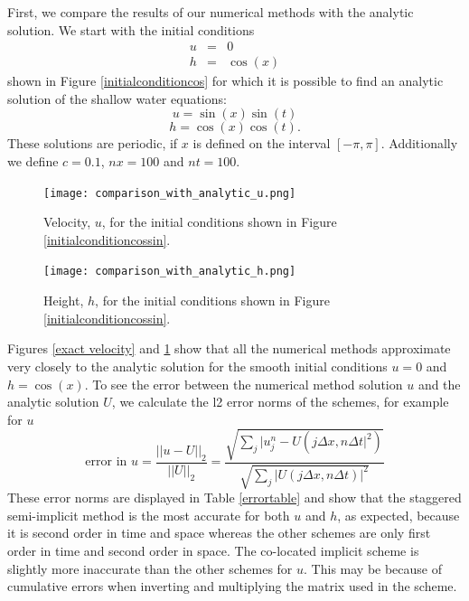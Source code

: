 \documentclass[a4paper, 10.5pt, notitlepage]{article}
\begin{document}
First, we compare the results of our numerical methods with the analytic solution. We start with the initial conditions 
\begin{eqnarray}
u  & =  & 0 \\
h & = &  \cos(x)
\end{eqnarray}
shown in Figure \ref{initialconditioncos} for which it is possible to find an analytic solution of the shallow water equations:
\begin{equation}\label{uanalytic}
u = \sin(x)\sin(t)
\end{equation}
\begin{equation}\label{hanalytic}
h = \cos(x)\cos(t).
\end{equation}
These solutions are periodic, if $x$ is defined on the interval $[-\pi, \pi]$. Additionally we define  $c = 0.1$, $nx = 100$ and $nt = 100$.


\renewcommand\theContinuedFloat{\alph{ContinuedFloat}}
\begin{figure} [H]
	\begin{minipage}{.5\textwidth}
		\ContinuedFloat*
		\captionsetup{width=0.9\textwidth}
		\captionsetup{justification=centering}
		\texttt{[image: comparison\_with\_analytic\_u.png]}
		\caption{\label{exact velocity} Velocity, $u$, for the initial conditions shown in Figure \ref{initialconditioncossin}. } 
	\end{minipage}
	\begin{minipage}{.5\textwidth}
		\ContinuedFloat
		\captionsetup{width=0.9\textwidth}
		\captionsetup{justification=centering}
		\texttt{[image: comparison\_with\_analytic\_h.png]}
		\caption{\label{exact height} Height, $h$, for the initial conditions shown in Figure \ref{initialconditioncossin}.} 
	\end{minipage}
\end{figure}

Figures \ref{exact velocity} and \ref{exact height} show that all the numerical methods approximate very closely to the analytic solution for the smooth initial conditions $u= 0$ and $h= \cos(x)$. To see the error between the numerical method solution $u$ and the analytic solution $U$, we calculate the l2 error norms of the schemes, for example for $u$
\begin{equation}
\text{error in } u = \frac{\lvert \lvert u - U\rvert\rvert_{2}}{\lvert \lvert U\rvert\rvert _{2}} = \frac{\sqrt{\sum_{j} \lvert u_{j}^{n} - U(j\Delta x, n\Delta t\rvert^{2})}}{\sqrt{\sum_{j} \lvert U(j\Delta x, n\Delta t)\rvert^{2}}}
\end{equation}
These error norms are displayed in Table \ref{errortable} and show that the staggered semi-implicit method is the most accurate for both $u$ and $h$, as expected, because it is second order in time and space whereas the other schemes are only first order in time and second order in space. The co-located implicit scheme is slightly more inaccurate than the other schemes for $u$. This may be because of cumulative errors when inverting and multiplying the matrix used in the scheme.
\end{document}
